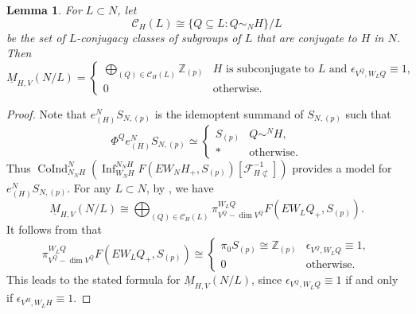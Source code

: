 \documentclass{amsart}
\theoremstyle{plain}
\newtheorem{lemma}[theorem]{Lemma}
\theoremstyle{definition}
\theoremstyle{remark}
\begin{document}
    \begin{lemma}
        For $L\subset N$, let 
        \[
        \mathcal{C}_H (L)\cong \{Q\subseteq L:Q\sim_N H\}/L
        \]
        be the set of $L$-conjugacy classes of subgroups of $L$ that are conjugate to $H$ in $N$. Then
        \[\underline M_{H,V}(N/L)=\begin{cases}\bigoplus_{(Q)\in \mathcal{C}_H(L)}\mathbb Z_{(p)} & H \text{ is subconjugate to } L\text{ and }\epsilon_{V^Q,W_L Q}\equiv 1,\\0 &\text{otherwise}.\end{cases}\]
    \end{lemma}
    \begin{proof}
        Note that $e_{(H)}^N S_{N,(p)}$ is the idemoptent summand of $S_{N,(p)}$ such that 
        \[
        \Phi^Q e_{(H)}^N S_{N,(p)}\simeq \begin{cases}
            S_{(p)} & Q\sim^N H,\\
            \ast & \text{otherwise.}
        \end{cases}
        \]
        Thus $\operatorname{CoInd}_{N_N H}^N (\operatorname{Inf}_{W_N H}^{N_N H} F(EW_N H_+, S_{(p)})[\mathcal{F}_{H\not\subset}^{-1}])$ provides a model for $e_{(H)}^N S_{N,(p)}$. For any $L\subset N$, by , we have 
        \[
        \underline{M}_{H,V}(N/L)\cong \bigoplus_{(Q)\in \mathcal{C}_H(L)}\pi_{V^Q-\dim V^Q}^{W_L Q} F(EW_L Q_+, S_{(p)}).
        \] 
        It follows from  that
        \[
        \pi_{V^Q-\dim V^Q}^{W_L Q} F(EW_L Q_+, S_{(p)})\cong \begin{cases}
            \pi_0 S_{(p)}\cong \mathbb Z_{(p)} & \epsilon_{V^Q,W_L Q}\equiv 1,\\
            0 & \text{otherwise.}
        \end{cases}
        \]
        This leads to the stated formula for $\underline M_{H,V}(N/L)$, since $\epsilon_{V^Q,W_L Q}\equiv 1$ if and only if $\epsilon_{V^H,W_L H}\equiv 1$.


\end{proof}
\end{document}
